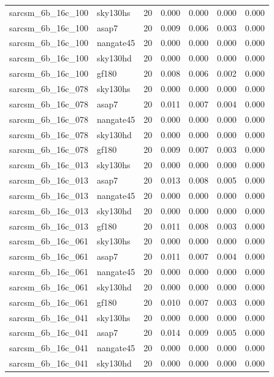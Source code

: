 \begin{tabular}{llrrrrr}
sarcsm\_6b\_16c\_100 & sky130hs & 20 & 0.000 & 0.000 & 0.000 & 0.000 \\
sarcsm\_6b\_16c\_100 & asap7 & 20 & 0.009 & 0.006 & 0.003 & 0.000 \\
sarcsm\_6b\_16c\_100 & nangate45 & 20 & 0.000 & 0.000 & 0.000 & 0.000 \\
sarcsm\_6b\_16c\_100 & sky130hd & 20 & 0.000 & 0.000 & 0.000 & 0.000 \\
sarcsm\_6b\_16c\_100 & gf180 & 20 & 0.008 & 0.006 & 0.002 & 0.000 \\
sarcsm\_6b\_16c\_078 & sky130hs & 20 & 0.000 & 0.000 & 0.000 & 0.000 \\
sarcsm\_6b\_16c\_078 & asap7 & 20 & 0.011 & 0.007 & 0.004 & 0.000 \\
sarcsm\_6b\_16c\_078 & nangate45 & 20 & 0.000 & 0.000 & 0.000 & 0.000 \\
sarcsm\_6b\_16c\_078 & sky130hd & 20 & 0.000 & 0.000 & 0.000 & 0.000 \\
sarcsm\_6b\_16c\_078 & gf180 & 20 & 0.009 & 0.007 & 0.003 & 0.000 \\
sarcsm\_6b\_16c\_013 & sky130hs & 20 & 0.000 & 0.000 & 0.000 & 0.000 \\
sarcsm\_6b\_16c\_013 & asap7 & 20 & 0.013 & 0.008 & 0.005 & 0.000 \\
sarcsm\_6b\_16c\_013 & nangate45 & 20 & 0.000 & 0.000 & 0.000 & 0.000 \\
sarcsm\_6b\_16c\_013 & sky130hd & 20 & 0.000 & 0.000 & 0.000 & 0.000 \\
sarcsm\_6b\_16c\_013 & gf180 & 20 & 0.011 & 0.008 & 0.003 & 0.000 \\
sarcsm\_6b\_16c\_061 & sky130hs & 20 & 0.000 & 0.000 & 0.000 & 0.000 \\
sarcsm\_6b\_16c\_061 & asap7 & 20 & 0.011 & 0.007 & 0.004 & 0.000 \\
sarcsm\_6b\_16c\_061 & nangate45 & 20 & 0.000 & 0.000 & 0.000 & 0.000 \\
sarcsm\_6b\_16c\_061 & sky130hd & 20 & 0.000 & 0.000 & 0.000 & 0.000 \\
sarcsm\_6b\_16c\_061 & gf180 & 20 & 0.010 & 0.007 & 0.003 & 0.000 \\
sarcsm\_6b\_16c\_041 & sky130hs & 20 & 0.000 & 0.000 & 0.000 & 0.000 \\
sarcsm\_6b\_16c\_041 & asap7 & 20 & 0.014 & 0.009 & 0.005 & 0.000 \\
sarcsm\_6b\_16c\_041 & nangate45 & 20 & 0.000 & 0.000 & 0.000 & 0.000 \\
sarcsm\_6b\_16c\_041 & sky130hd & 20 & 0.000 & 0.000 & 0.000 & 0.000 \\

\end{tabular}
